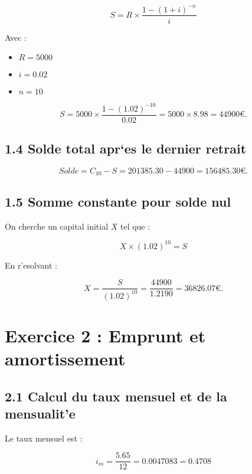 \documentclass[a4paper, 12pt]{article}
\begin{document}
	\begin{equation}
		S = R \times \frac{1 - (1+i)^{-n}}{i}
	\end{equation}
	
	Avec :
	\begin{itemize}
		\item $ R = 5 000 $
		\item $ i = 0.02 $
		\item $ n = 10 $
	\end{itemize}
	
	\begin{equation}
		S = 5 000 \times \frac{1 - (1.02)^{-10}}{0.02} = 5 000 \times 8.98 = 44 900 \euro.
	\end{equation}
	
	\subsection*{1.4 Solde total apr`es le dernier retrait}
	
	\begin{equation}
		Solde = C_{10} - S = 201 385.30 - 44 900 = 156 485.30 \euro.
	\end{equation}
	
	\subsection*{1.5 Somme constante pour solde nul}
	On cherche un capital initial $ X $ tel que :
	
	\begin{equation}
		X \times (1.02)^{10} = S
	\end{equation}
	
	En r'esolvant :
	
	\begin{equation}
		X = \frac{S}{(1.02)^{10}} = \frac{44 900}{1.2190} = 36 826.07 \euro.
	\end{equation}
	
	\section*{Exercice 2 : Emprunt et amortissement}
	
	\subsection*{2.1 Calcul du taux mensuel et de la mensualit'e}
	Le taux mensuel est :
	
	\begin{equation}
		i_m = \frac{5.65}{12} = 0.0047083 = 0.4708%
	\end{equation}
	
\end{document}
